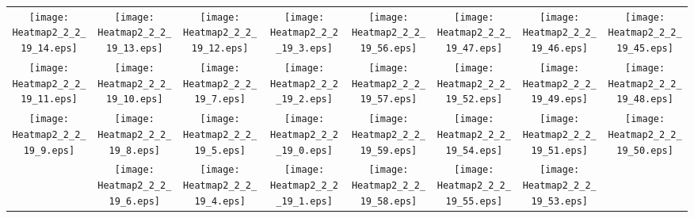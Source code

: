 \documentclass{standalone}
\begin{document}
\begin{tabular}{ *8{c} }
\texttt{[image: Heatmap2\_2\_2\_19\_14.eps]} & \texttt{[image: Heatmap2\_2\_2\_19\_13.eps]} & \texttt{[image: Heatmap2\_2\_2\_19\_12.eps]} & \texttt{[image: Heatmap2\_2\_2\_19\_3.eps]} & \texttt{[image: Heatmap2\_2\_2\_19\_56.eps]} & \texttt{[image: Heatmap2\_2\_2\_19\_47.eps]} & \texttt{[image: Heatmap2\_2\_2\_19\_46.eps]} & \texttt{[image: Heatmap2\_2\_2\_19\_45.eps]} \\
\texttt{[image: Heatmap2\_2\_2\_19\_11.eps]} & \texttt{[image: Heatmap2\_2\_2\_19\_10.eps]} & \texttt{[image: Heatmap2\_2\_2\_19\_7.eps]} & \texttt{[image: Heatmap2\_2\_2\_19\_2.eps]} & \texttt{[image: Heatmap2\_2\_2\_19\_57.eps]} & \texttt{[image: Heatmap2\_2\_2\_19\_52.eps]} & \texttt{[image: Heatmap2\_2\_2\_19\_49.eps]} & \texttt{[image: Heatmap2\_2\_2\_19\_48.eps]} \\
\texttt{[image: Heatmap2\_2\_2\_19\_9.eps]} & \texttt{[image: Heatmap2\_2\_2\_19\_8.eps]} & \texttt{[image: Heatmap2\_2\_2\_19\_5.eps]} & \texttt{[image: Heatmap2\_2\_2\_19\_0.eps]} & \texttt{[image: Heatmap2\_2\_2\_19\_59.eps]} & \texttt{[image: Heatmap2\_2\_2\_19\_54.eps]} & \texttt{[image: Heatmap2\_2\_2\_19\_51.eps]} & \texttt{[image: Heatmap2\_2\_2\_19\_50.eps]} \\
 & \texttt{[image: Heatmap2\_2\_2\_19\_6.eps]} & \texttt{[image: Heatmap2\_2\_2\_19\_4.eps]} & \texttt{[image: Heatmap2\_2\_2\_19\_1.eps]} & \texttt{[image: Heatmap2\_2\_2\_19\_58.eps]} & \texttt{[image: Heatmap2\_2\_2\_19\_55.eps]} & \texttt{[image: Heatmap2\_2\_2\_19\_53.eps]} &  
\end{tabular}
\end{document}

